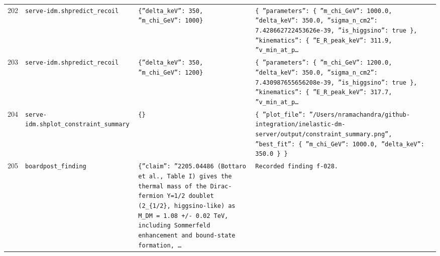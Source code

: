 \documentclass[11pt,a4paper]{article}
\begin{document}
\begin{longtable}{@{}p{}p{}p{}p{}@{}}
202 & \texttt{serve-idm.sh}\newline\texttt{predict\_\allowbreak{}recoil} & \texttt{\{''delta\_\allowbreak{}keV'':\allowbreak{} 350,\allowbreak{} ''m\_\allowbreak{}chi\_\allowbreak{}GeV'':\allowbreak{} 1000\}\allowbreak{}} & \texttt{\{   ''parameters'':\allowbreak{} \{     ''m\_\allowbreak{}chi\_\allowbreak{}GeV'':\allowbreak{} 1000.0,\allowbreak{}     ''delta\_\allowbreak{}keV'':\allowbreak{} 350.0,\allowbreak{}     ''sigma\_\allowbreak{}n\_\allowbreak{}cm2'':\allowbreak{} 7.428662722453626e-39,\allowbreak{}     ''is\_\allowbreak{}higgsino'':\allowbreak{} true   \}\allowbreak{},\allowbreak{}   ''kinematics'':\allowbreak{} \{     ''E\_\allowbreak{}R\_\allowbreak{}peak\_\allowbreak{}keV'':\allowbreak{} 311.9,\allowbreak{}     ''v\_\allowbreak{}min\_\allowbreak{}at\_\allowbreak{}p\ldots{}\allowbreak{}} \\
203 & \texttt{serve-idm.sh}\newline\texttt{predict\_\allowbreak{}recoil} & \texttt{\{''delta\_\allowbreak{}keV'':\allowbreak{} 350,\allowbreak{} ''m\_\allowbreak{}chi\_\allowbreak{}GeV'':\allowbreak{} 1200\}\allowbreak{}} & \texttt{\{   ''parameters'':\allowbreak{} \{     ''m\_\allowbreak{}chi\_\allowbreak{}GeV'':\allowbreak{} 1200.0,\allowbreak{}     ''delta\_\allowbreak{}keV'':\allowbreak{} 350.0,\allowbreak{}     ''sigma\_\allowbreak{}n\_\allowbreak{}cm2'':\allowbreak{} 7.430987655656208e-39,\allowbreak{}     ''is\_\allowbreak{}higgsino'':\allowbreak{} true   \}\allowbreak{},\allowbreak{}   ''kinematics'':\allowbreak{} \{     ''E\_\allowbreak{}R\_\allowbreak{}peak\_\allowbreak{}keV'':\allowbreak{} 317.7,\allowbreak{}     ''v\_\allowbreak{}min\_\allowbreak{}at\_\allowbreak{}p\ldots{}\allowbreak{}} \\
204 & \texttt{serve-idm.sh}\newline\texttt{plot\_\allowbreak{}constraint\_\allowbreak{}summary} & \texttt{\{\}\allowbreak{}} & \texttt{\{   ''plot\_\allowbreak{}file'':\allowbreak{} ''/\allowbreak{}Users/\allowbreak{}nramachandra/\allowbreak{}github-integration/\allowbreak{}inelastic-dm-server/\allowbreak{}output/\allowbreak{}constraint\_\allowbreak{}summary.png'',\allowbreak{}   ''best\_\allowbreak{}fit'':\allowbreak{} \{     ''m\_\allowbreak{}chi\_\allowbreak{}GeV'':\allowbreak{} 1000.0,\allowbreak{}     ''delta\_\allowbreak{}keV'':\allowbreak{} 350.0   \}\allowbreak{} \}\allowbreak{}} \\
205 & \texttt{board}\newline\texttt{post\_\allowbreak{}finding} & \texttt{\{''claim'':\allowbreak{} ''2205.04486 (Bottaro et al.,\allowbreak{} Table I)\allowbreak{} gives the thermal mass of the Dirac-fermion Y=\allowbreak{}1/\allowbreak{}2 doublet (2\_\allowbreak{}\{1/\allowbreak{}2\}\allowbreak{},\allowbreak{} higgsino-like)\allowbreak{} as M\_\allowbreak{}DM =\allowbreak{} 1.08 +/\allowbreak{}- 0.02 TeV,\allowbreak{} including Sommerfeld enhancement and bound-state formation,\allowbreak{} \ldots{}\allowbreak{}} & \texttt{Recorded finding f-028.} \\

\end{longtable}
\end{document}
